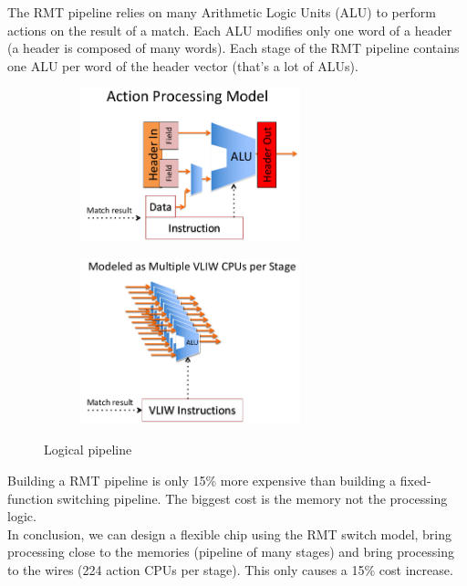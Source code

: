 \documentclass[11pt,oneside,a4paper]{article}
\begin{document}
\newpage

\noindent The RMT pipeline relies on many Arithmetic Logic Units (ALU) to perform actions on the result of a match. Each ALU modifies only one word of a header (a header is composed of many words). Each stage of the RMT pipeline contains one ALU per word of the header vector (that's a lot of ALUs).

\begin{figure}[hb]
	\centering
	\begin{subfigure}[t]{.5\textwidth}
		\centering
		\includegraphics[width=0.7\textwidth,scale=1]{figures/action_processing_model}
		\label{fig:rmt_logical_pipeline}
	\end{subfigure}%
	\begin{subfigure}[t]{.5\textwidth}
		\centering
		\includegraphics[width=0.7\textwidth,scale=1]{figures/multi_action_processing}
		\label{fig:rmt_physical_stages}
	\end{subfigure}
	\caption{Logical pipeline \cite{gibb2013design}}
\end{figure}

\noindent Building a RMT pipeline is only 15\% more expensive than building a fixed-function switching pipeline. The biggest cost is the memory not the processing logic.\\
In conclusion, we can design a flexible chip using the RMT switch model, bring processing close to the memories (pipeline of many stages) and bring processing to the wires (224 action CPUs per stage). This only causes a 15\% cost increase.











\label{lastpage} %
\clearpage
{}



\clearpage
\appendix
{}
\end{document}
